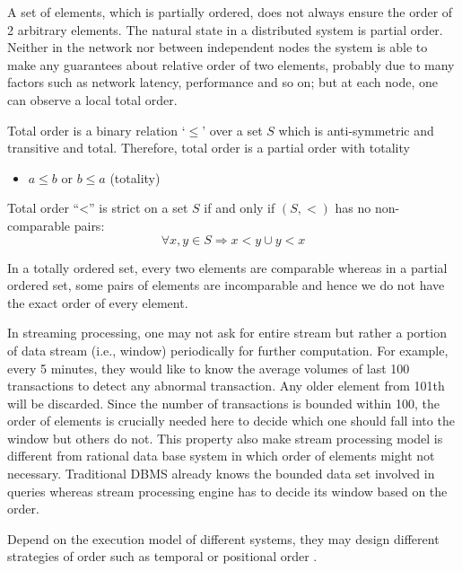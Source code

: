A set of elements, which is partially ordered, does not always ensure the order of  2 arbitrary elements. The natural state in a distributed system is partial order. Neither in the network nor between independent nodes the system is able to make any guarantees about relative order of two elements, probably due to many factors such as network latency, performance and so on; but at each node, one can observe a local total order.

\begin{defi}
 Total order \citep{Simovici:2008} is a binary relation `$\leq$' over a set $S$ which is anti-symmetric and transitive and total. Therefore, total order is a partial order with totality
 
 \begin{itemize}
	 \item $a \leq b$ or $b \leq a$  (totality)
\end{itemize}
\end{defi}

Total order ``<'' is strict on a set $S$ if and only if $(S, <)$ has no non-comparable pairs:
\begin{equation}
 \forall x, y \in S \Rightarrow  x < y \cup y < x 
\end{equation} 


In a totally ordered set, every two elements are comparable whereas in a partial ordered set, some pairs of elements are incomparable and hence we do not have the exact order of every element.

In streaming processing, one may not ask for entire stream  but rather a portion of data stream (i.e., window) periodically for further computation. For example, every 5 minutes, they would like to know the average volumes of last 100 transactions to detect any abnormal transaction. Any older element from 101th will be discarded. Since the number of transactions is bounded within 100, the order of elements is crucially needed here to decide which one should fall into the window but others do not. This property also make stream processing model is different from rational data base system in which order of elements might not necessary. Traditional DBMS already knows the bounded data set involved in queries whereas stream processing engine has to decide its window based on the order.

Depend on the execution model of different systems, they may design different strategies of order such as temporal or positional order \citep{Petit:2012}.

